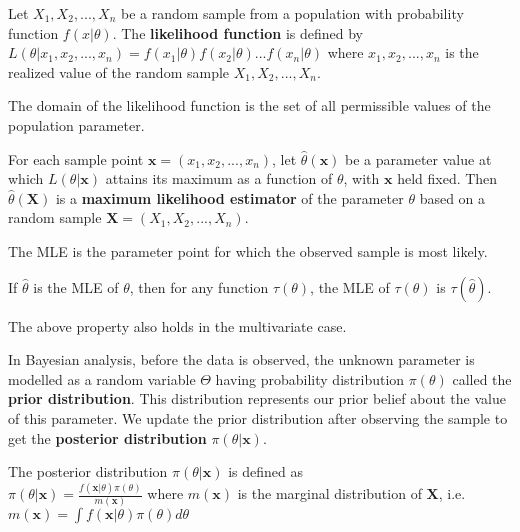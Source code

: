 \begin{defn}
    Let $X_1, X_2, ..., X_n$ be a random sample from a population with probability function $f(x|\theta)$.
    The \textbf{likelihood function} is defined by $L(\theta|x_1, x_2, ..., x_n) = f(x_1|\theta) f(x_2|\theta) ... f(x_n|\theta)$ where $x_1, x_2, ..., x_n$ is the realized value of the random sample $X_1, X_2, ..., X_n$.
\end{defn}

\begin{note}
    The domain of the likelihood function is the set of all permissible values of the population parameter.
\end{note}

\begin{defn}
    For each sample point $\bm{x} = (x_1, x_2, ..., x_n)$, let $\hat{\theta}(\bm{x})$ be a parameter value at which $L(\theta|\bm{x})$ attains its maximum as a function of $\theta$, with $\bm{x}$ held fixed. Then $\hat{\theta}(\bm{X})$ is a \textbf{maximum likelihood estimator} of the parameter $\theta$ based on a random sample $\bm{X} = (X_1, X_2, ..., X_n)$.
\end{defn}

\begin{note}
    The MLE is the parameter point for which the observed sample is most likely.
\end{note}

\begin{thm}
    If $\hat{\theta}$ is the MLE of $\theta$, then for any function $\tau(\theta)$, the MLE of $\tau(\theta)$ is $\tau(\hat{\theta})$.
\end{thm}

\begin{note}
    The above property also holds in the multivariate case.
\end{note}

\begin{defn}
    In Bayesian analysis, before the data is observed, the unknown parameter is modelled as a random variable $\Theta$ having probability distribution $\pi(\theta)$ called the \textbf{prior distribution}. This distribution represents our prior belief about the value of this parameter. We update the prior distribution after observing the sample to get the \textbf{posterior distribution} $\pi(\theta|\bm{x})$.

    The posterior distribution $\pi(\theta|\bm{x})$ is defined as 
    \\ $\pi(\theta|\bm{x}) = \frac{f(\bm{x}|\theta) \pi(\theta) }{m(\bm{x})}$ where $m(\bm{x})$ is the marginal distribution of $\bm{X}$, i.e. $m(\bm{x}) = \int f(\bm{x} | \theta) \pi(\theta) d\theta$
\end{defn}

